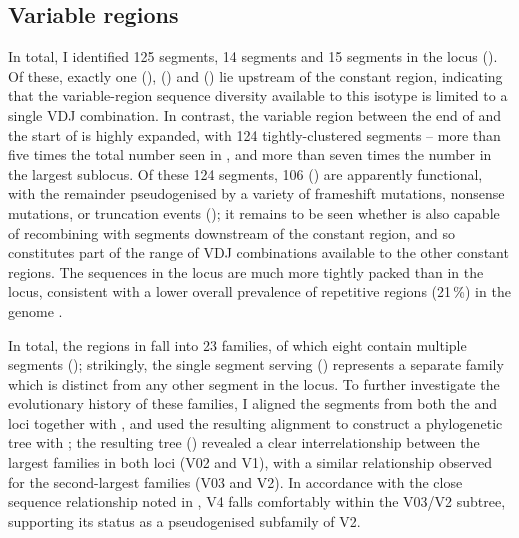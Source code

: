 	
\subsection{Variable regions}
\label{sec:xma-locus-variable}

In total, I identified 125 \vh segments, 14 \dh segments and 15 \jh segments in the \Xma \igh{} locus (). Of these, exactly one \vh (), \dh () and \jh () lie upstream of the  constant region, indicating that the variable-region sequence diversity available to this isotype is limited to a single VDJ combination. In contrast, the variable region between the end of  and the start of  is highly expanded, with 124 tightly-clustered \vh segments -- more than five times the total number seen in \Nfu, and more than seven times the number in the largest \Nfu sublocus. Of these 124 \vh segments, 106 () are apparently functional, with the remainder pseudogenised by a variety of frameshift mutations, nonsense mutations, or truncation events (); it remains to be seen whether  is also capable of recombining with \dh segments downstream of the  constant region, and so constitutes part of the range of VDJ combinations available to the other constant regions. The \vh sequences in the \Xma locus are much more tightly packed than in the \Nfu locus, consistent with a lower overall prevalence of repetitive regions (21\,\%) in the \Xma genome \parencite{yuan2018repeats}.
	
In total, the \vh regions in \Xma \igh{} fall into 23 families, of which eight contain multiple segments (); strikingly, the single \vh segment serving  () represents a separate family which is distinct from any other segment in the locus. To further investigate the evolutionary history of these families, I aligned the \vh segments from both the \Xma and \Nfu \igh{} loci together with , and used the resulting alignment to construct a phylogenetic tree with  \parencite{stamatakis2014raxml8,stamatakis2005raxml3,stamatakis2006raxml6}; the resulting tree () revealed a clear interrelationship between the largest families in both loci (\Xma V02 and \Nfu V1), with a similar relationship observed for the second-largest families (\Xma V03 and \Nfu V2). 
In accordance with the close sequence relationship noted in , \Nfu V4 falls comfortably within the V03/V2 subtree, supporting its status as a pseudogenised subfamily of \Nfu V2.
		
